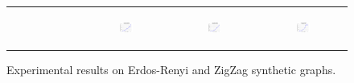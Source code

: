 \begin{figure}[ht]
\begin{tabular}{cccc}
\begin{subfigure}[b]{0.22\textwidth}
			\caption{}
			\label{appfig:validated_OCC_bigsynthetic_maxgraphcut}
	  \end{subfigure} &
	  \begin{subfigure}[b]{0.22\textwidth}
	  	\includegraphics[width=110pt]{images/validated_OCC_bigsynthetic_setcover.png}
			\caption{}
			\label{appfig:validated_OCC_bigsynthetic_setcover}
	  \end{subfigure} &
	  \begin{subfigure}[b]{0.22\textwidth}
	  	\includegraphics[width=110pt]{images/validated_OCC_zigzag_maxgraphcut.png}
			\caption{}
			\label{appfig:validated_OCC_zigzag_maxgraphcut}
	  \end{subfigure} &
	  \begin{subfigure}[b]{0.22\textwidth}
	  	\includegraphics[width=110pt]{images/validated_OCC_zigzag_setcover.png}
			\caption{}
			\label{appfig:validated_OCC_zigzag_setcover}
	  \end{subfigure} \\
  \end{tabular}
  \caption{Experimental results on Erdos-Renyi and ZigZag synthetic graphs.}
\end{figure}


